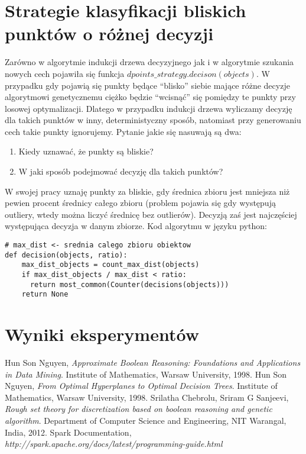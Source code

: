 \documentclass[magisterska]{pracamgr}
\theoremstyle{plain}
\theoremstyle{definition}
\theoremstyle{remark}
\begin{document}
\section{Strategie klasyfikacji bliskich punktów o różnej decyzji}
Zarówno w algorytmie indukcji drzewa decyzyjnego jak i w algorytmie szukania 
nowych cech pojawiła się funkcja $dpoints\_strategy.decison(objects)$. W przypadku
gdy pojawią się punkty będące ``blisko'' siebie mające różne decyzje algorytmowi genetycznemu ciężko
będzie ``wcisnąć'' się pomiędzy te punkty przy losowej optymalizacji. Dlatego w przypadku indukcji drzewa 
wyliczamy decyzję dla takich punktów w inny, deterministyczny sposób, natomiast przy generowaniu cech
takie punkty ignorujemy. Pytanie jakie się nasuwają są dwa:
\begin{enumerate}
 \item Kiedy uznawać, że punkty są bliskie?
 \item W jaki sposób podejmować decyzję dla takich punktów?
\end{enumerate}
W swojej pracy uznaję punkty za bliskie, gdy średnica zbioru jest mniejsza niż pewien procent 
średnicy całego zbioru (problem pojawia się gdy występują outliery, wtedy można liczyć średnicę
bez outlierów). Decyzją zaś jest najczęściej występująca decyzja w danym zbiorze. Kod algorytmu w języku python:
\begin{lstlisting}
# max_dist <- srednia calego zbioru obiektow
def decision(objects, ratio):
	max_dist_objects = count_max_dist(objects)
	if max_dist_objects / max_dist < ratio:
	  return most_common(Counter(decisions(objects)))
	return None
\end{lstlisting}


\section{Wyniki eksperymentów}

\begin{thebibliography}{9}

  Hun Son Nguyen,
  \emph{Approximate Boolean Reasoning: Foundations and Applications in Data Mining}.
  Institute of Mathematics, Warsaw University,
  1998.
  Hun Son Nguyen,
  \emph{From Optimal Hyperplanes to Optimal Decision Trees}.
  Institute of Mathematics, Warsaw University,
  1998.
  Srilatha Chebrolu, Sriram G Sanjeevi,
  \emph{Rough set theory for discretization based on boolean reasoning and 
  genetic algorithm}.
  Department of Computer Science and Engineering, NIT Warangal, India,
  2012.
 Spark Documentation,
 \emph{http://spark.apache.org/docs/latest/programming-guide.html}

\end{thebibliography}
 
\end{document}
